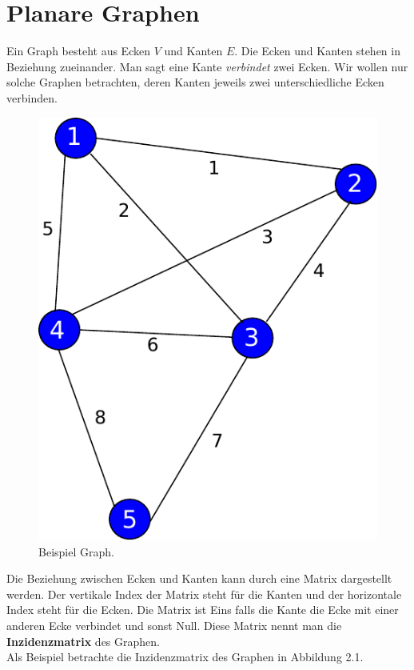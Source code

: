 \documentclass[11pt,a4paper,leqno]{report}
\numberwithin{equation}{chapter}
\begin{document}
\chapter{Planare Graphen}

	Ein Graph besteht aus Ecken $V$ und Kanten $E$. Die Ecken und Kanten stehen in Beziehung zueinander. Man sagt eine Kante \emph{verbindet} zwei Ecken. Wir wollen nur solche Graphen betrachten, deren Kanten jeweils zwei unterschiedliche Ecken verbinden.
\begin{figure}[H]
	\begin{center}
		\includegraphics[scale=0.4]{Abbildungen/graph_1.pdf}
		\caption{Beispiel Graph.}
	\end{center}
\end{figure}
\noindent
	Die Beziehung zwischen Ecken und Kanten kann durch eine Matrix dargestellt werden. Der vertikale Index der Matrix steht f\"ur die Kanten und der horizontale Index steht f\"ur die Ecken. Die Matrix ist Eins falls die Kante die Ecke mit einer anderen Ecke verbindet und sonst Null. Diese Matrix nennt man die \textbf{Inzidenzmatrix} des Graphen.\\
	Als Beispiel betrachte die Inzidenzmatrix des Graphen in Abbildung 2.1.
\end{document}
